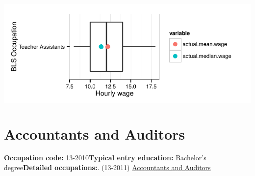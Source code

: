 \documentclass[a4paper,10pt]{article}\usepackage[]{graphicx}\usepackage[]{color}
\makeatletter
\def\maxwidth{ %
  \ifdim\Gin@nat@width>\linewidth
    \linewidth
  \else
    \Gin@nat@width
  \fi
}
\makeatother
\begin{document}
{\centering \includegraphics[width=\maxwidth]{figure/unnamed-chunk-225} 

}


\newpage\section{Accountants and Auditors}\textbf{Occupation code:} 13-2010\newline\textbf{Typical entry education:} Bachelor's degree\newline\textbf{Detailed occupations:}. (13-2011)  \href{http://www.bls.gov/oes/current/oes132011.htm}{Accountants and Auditors}\newline%
\end{document}
